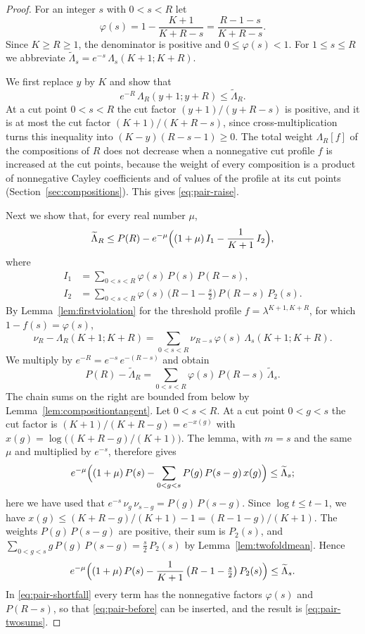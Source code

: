 \documentclass{amsart}
\theoremstyle{definition}
\theoremstyle{remark}
\numberwithin{equation}{section}
\begin{document}
\begin{proof}
For an integer $s$ with $0<s<R$ let
\[
\varphi(s)=1-\frac{K+1}{K+R-s}=\frac{R-1-s}{K+R-s}.
\]
Since $K\ge R\ge1$, the denominator is positive and $0\le\varphi(s)<1$. For
$1\le s\le R$ we abbreviate
$\widetilde\Lambda_s=e^{-s}\,\Lambda_s(K+1;K+R)$.

We first replace $y$ by $K$ and show that
\begin{equation}\label{eq:pair-raise}
e^{-R}\,\Lambda_R(y+1;y+R)\le\widetilde\Lambda_R.
\end{equation}
At a cut point $0<s<R$ the cut factor $(y+1)/(y+R-s)$ is positive, and it
is at most the cut factor $(K+1)/(K+R-s)$, since cross-multiplication turns
this inequality into $(K-y)(R-s-1)\ge0$. The total weight $\Lambda_R[f]$
of the compositions of $R$ does not decrease when a nonnegative cut profile
$f$ is increased at the cut points, because the weight of every composition
is a product of nonnegative Cayley coefficients and of values of the
profile at its cut points (Section~\ref{sec:compositions}). This gives
\eqref{eq:pair-raise}.

Next we show that, for every real number $\mu$,
\begin{equation}\label{eq:pair-twosums}
\widetilde\Lambda_R\le P(R)-e^{-\mu}\Bigl((1+\mu)\,I_1
-\frac{1}{K+1}\,I_2\Bigr),
\end{equation}
where
\begin{align*}
I_1&=\sum_{0<s<R}\varphi(s)\,P(s)\,P(R-s),\\
I_2&=\sum_{0<s<R}\varphi(s)\,\bigl(R-1-\tfrac s2\bigr)\,P(R-s)\,P_2(s).
\end{align*}
By Lemma~\ref{lem:firstviolation} for the threshold profile
$f=\lambda^{K+1,K+R}$, for which $1-f(s)=\varphi(s)$,
\[
\nu_R-\Lambda_R(K+1;K+R)
=\sum_{0<s<R}\nu_{R-s}\,\varphi(s)\,\Lambda_s(K+1;K+R).
\]
We multiply by $e^{-R}=e^{-s}\,e^{-(R-s)}$ and obtain
\begin{equation}\label{eq:pair-shortfall}
P(R)-\widetilde\Lambda_R=\sum_{0<s<R}\varphi(s)\,P(R-s)\,\widetilde\Lambda_s.
\end{equation}
The chain sums on the right are bounded from below by
Lemma~\ref{lem:compositiontangent}. Let $0<s<R$. At a cut point $0<g<s$ the
cut factor is $(K+1)/(K+R-g)=e^{-x(g)}$ with
$x(g)=\log\bigl((K+R-g)/(K+1)\bigr)$. The lemma, with $m=s$ and the same $\mu$
and multiplied by $e^{-s}$, therefore gives
\[
e^{-\mu}\Bigl((1+\mu)\,P(s)-\sum_{0<g<s}P(g)\,P(s-g)\,x(g)\Bigr)
\le\widetilde\Lambda_s;
\]
here we have used that $e^{-s}\,\nu_g\,\nu_{s-g}=P(g)\,P(s-g)$. Since
$\log t\le t-1$, we have $x(g)\le(K+R-g)/(K+1)-1=(R-1-g)/(K+1)$. The weights
$P(g)\,P(s-g)$ are positive, their sum is $P_2(s)$, and
$\sum_{0<g<s}g\,P(g)\,P(s-g)=\frac s2\,P_2(s)$ by
Lemma~\ref{lem:twofoldmean}. Hence
\begin{equation}\label{eq:pair-before}
e^{-\mu}\Bigl((1+\mu)\,P(s)-\frac{1}{K+1}\,\bigl(R-1-\tfrac s2\bigr)\,
P_2(s)\Bigr)\le\widetilde\Lambda_s.
\end{equation}
In \eqref{eq:pair-shortfall} every term has the nonnegative factors
$\varphi(s)$ and $P(R-s)$, so that \eqref{eq:pair-before} can be inserted,
and the result is \eqref{eq:pair-twosums}.


\end{proof}
\end{document}
